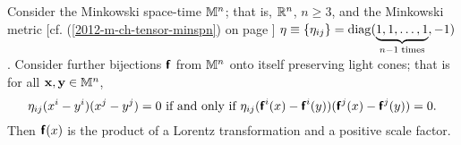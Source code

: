 Consider the Minkowski space-time
${\Bbb M}^n$; that is,  ${\Bbb R}^n$, $n\ge 3$, and the Minkowski metric
[cf. (\ref{2012-m-ch-tensor-minspn}) on page \pageref{2012-m-ch-tensor-minspn}]
$\eta \equiv \{\eta_{ij}\}={\rm diag} (\underbrace{1,1,\ldots ,1}_{n-1\; {\rm times}},-1)$.
Consider further  bijections $\textsf{\textbf{f}}$ from  ${\Bbb M}^n$
onto itself preserving light cones; that is
for all ${\bf x}, {\bf y} \in {\Bbb M}^n$,
$$ \eta_{ij} (x^i-y^i)(x^j-y^j)=0 \textrm{ if and only if }
\eta_{ij} (\textsf{\textbf{f}}^i(x)-\textsf{\textbf{f}}^i(y))
(\textsf{\textbf{f}}^j(x)-\textsf{\textbf{f}}^j(y))=0.$$
Then $\textsf{\textbf{f}}(x)$ is the product of a Lorentz transformation
and a positive scale factor.

\begin{center}
{\color{olive}   \Huge
 \floweroneleft
}
\end{center}

